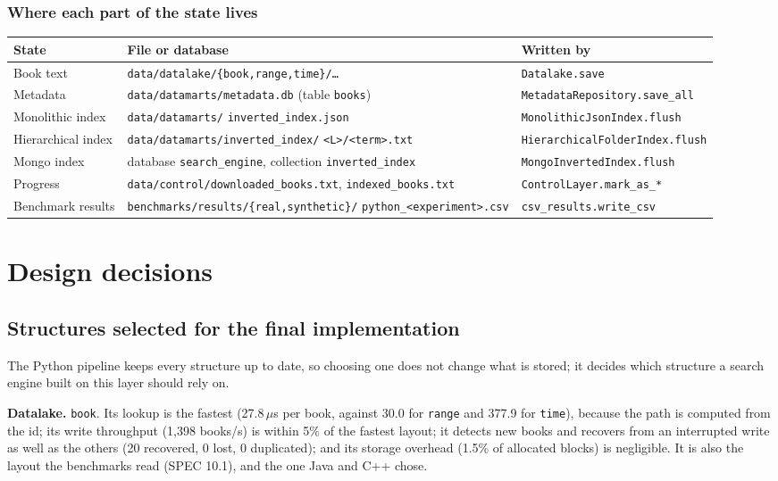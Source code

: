 \documentclass[11pt,a4paper]{article}
\newcommand{\code}[1]{\texttt{#1}}
\newcommand{\us}{\,$\mu$s}
\begin{document}
\subsubsection{Where each part of the state lives}
\begin{table}[H]
\centering\small
\begin{tabularx}{\linewidth}{@{}p{2.3cm} Y p{5.4cm}@{}}
\toprule
State & File or database & Written by \\
\midrule
Book text & \code{data/datalake/\{book,range,time\}/\ldots} & \code{Datalake.save} \\
Metadata & \code{data/datamarts/metadata.db} (table \code{books}) & \code{MetadataRepository.save\_all} \\
Monolithic index & \code{data/datamarts/} \code{inverted\_index.json} & \code{MonolithicJsonIndex.flush} \\
Hierarchical index & \code{data/datamarts/inverted\_index/} \code{<L>/<term>.txt} & \code{HierarchicalFolderIndex.flush} \\
Mongo index & database \code{search\_engine}, collection \code{inverted\_index} & \code{MongoInvertedIndex.flush} \\
Progress & \code{data/control/downloaded\_books.txt}, \code{indexed\_books.txt} & \code{ControlLayer.mark\_as\_*} \\
Benchmark results & \code{benchmarks/results/\{real,synthetic\}/} \code{python\_<experiment>.csv} & \code{csv\_results.write\_csv} \\
\bottomrule
\end{tabularx}
\end{table}

\section{Design decisions}\label{sec:decisions}

\subsection{Structures selected for the final implementation}
The Python pipeline keeps every structure up to date, so choosing one does not change what is
stored; it decides which structure a search engine built on this layer should rely on.

\textbf{Datalake.} \code{book}. Its lookup is the fastest (27.8\us{} per book, against 30.0 for \code{range} and
377.9 for \code{time}), because the path is computed from the id; its write throughput (1,398
books/s) is within 5\% of the fastest layout; it detects new books and recovers from an interrupted
write as well as the others (20 recovered, 0 lost, 0 duplicated); and its storage overhead
(1.5\% of allocated blocks) is negligible. It is also the layout the benchmarks read (SPEC 10.1), and the one Java and C++ chose.
\end{document}
